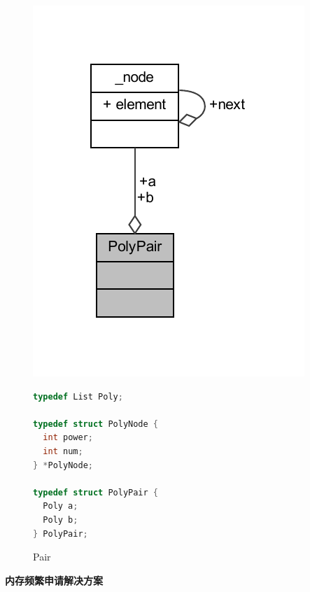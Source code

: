 \begin{figure}[H]
\begin{minipage}[c]{0.3\linewidth}
        \includegraphics[width=\linewidth]{figures/struct_poly_pair}
        \caption{Pair}
        \label{fig:structnode}
    \end{minipage}
    \begin{minipage}[c]{0.4\linewidth}
        \begin{lstlisting}[language = c]
typedef List Poly;

typedef struct PolyNode {
  int power;
  int num;
} *PolyNode;

typedef struct PolyPair {
  Poly a;
  Poly b;
} PolyPair;
        \end{lstlisting}
    \end{minipage}
\end{figure}

\textbf{内存频繁申请解决方案}

